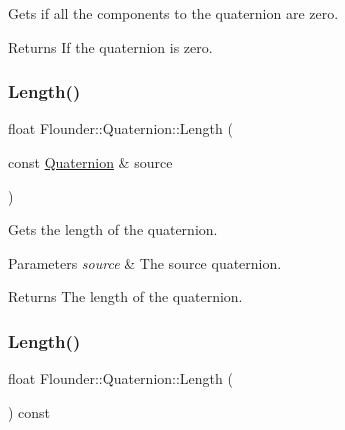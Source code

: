 Gets if all the components to the quaternion are zero. 

\begin{DoxyReturn}{Returns}
If the quaternion is zero. 
\end{DoxyReturn}
\mbox{\label{class_flounder_1_1_quaternion_a7b2f59b6aa9c88b3c8b6cf88999053b0}} 
\subsubsection{\texorpdfstring{Length()}{Length()}\hspace{0.1cm}{\footnotesize\ttfamily [1/2]}}
{\footnotesize\ttfamily float Flounder\+::\+Quaternion\+::\+Length (\begin{DoxyParamCaption}\item[{const \hyperlink{class_flounder_1_1_quaternion}{Quaternion} \&}]{source }\end{DoxyParamCaption})\hspace{0.3cm}{\ttfamily [static]}}



Gets the length of the quaternion. 


\begin{DoxyParams}{Parameters}
{\em source} & The source quaternion. \\
\hline
\end{DoxyParams}
\begin{DoxyReturn}{Returns}
The length of the quaternion. 
\end{DoxyReturn}
\mbox{\label{class_flounder_1_1_quaternion_ac35d4bb1fedfd7096f766c8dfa6bf646}} 
\subsubsection{\texorpdfstring{Length()}{Length()}\hspace{0.1cm}{\footnotesize\ttfamily [2/2]}}
{\footnotesize\ttfamily float Flounder\+::\+Quaternion\+::\+Length (\begin{DoxyParamCaption}{ }\end{DoxyParamCaption}) const}



